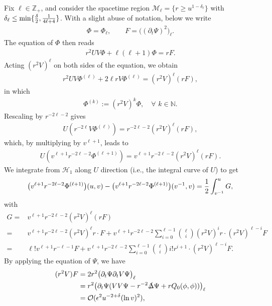 \documentclass[a4paper,reqno]{amsart}
\theoremstyle{definition}
\numberwithin{equation}{section}
\def\Deltas{\slashed{\Delta}}
\def\ep{\epsilon}
\begin{document}
Fix $\ell \in \mathbb{Z}_+$, and consider the spacetime region $\mathcal{M}_{\ell} =\{ r\geq u^{1-\delta_\ell} \}$ with $\delta_\ell \leq \min\{ {\delta\over 2},{1\over 4\ell + 4}\}$. 
With a slight abuse of notation, below we write
\begin{align*}
    \Phi = \Phi_{\ell}, \qquad F = \big((\partial_t \Psi)^2\big)_{\ell}.
\end{align*}
The equation of $\Phi$ then reads
\begin{align*}
    r^2 U V \Phi + \ell (\ell+1) \Phi = rF.
\end{align*}
Acting $(r^2 V)^\ell$ on both sides of the equation, we obtain
\begin{align*}
    r^2 U V \Phi^{(\ell)} + 2\ell r V\Phi^{(\ell)} = (r^2 V)^\ell (rF),
\end{align*}
in which
\begin{align*}
    \Phi^{(k)} := (r^2 V)^k \Phi, \quad \forall \,\, k\in\mathbb{N}.
\end{align*}
Rescaling by $r^{-2\ell -2}$ gives
\begin{align*}
    U(r^{-2\ell} V\Phi^{(\ell)})
    =
    r^{-2\ell-2} (r^2 V)^\ell (rF),
\end{align*}
which, by multiplying by $v^{\ell+1}$, leads to
\begin{align*}
    U(v^{\ell+1} r^{-2\ell-2} \Phi^{(\ell+1)})
    =
    v^{\ell+1}r^{-2\ell-2} (r^2 V)^\ell (rF).
\end{align*}
We integrate from $\mathcal{H}_1$ along $U$ direction (i.e., the integral curve of $U$) to get
\begin{align*}
    \big(v^{\ell+1} r^{-2\ell-2} \Phi^{(\ell+1)}\big)(u, v)
    -
    \big(v^{\ell+1} r^{-2\ell-2} \Phi^{(\ell+1)}\big)(v^{-1}, v)
    =
    {1\over 2}\int_{v^{-1}}^u G ,
\end{align*}
with
\begin{align*}
    G
    = {}&v^{\ell+1}r^{-2\ell-2} (r^2 V)^\ell (rF)
    \\
    = {}&v^{\ell+1} r^{-2\ell-2} (r^2 V)^{\ell}r \cdot F
    +
    v^{\ell+1} r^{-2\ell-2} \sum_{i=0}^{\ell-1} \binom{\ell}{i} (r^2 V)^{i} r \cdot (r^2 V)^{\ell-i}F
    \\
    ={}
    &\ell! v^{\ell+1} r^{-\ell-1} F
    +
     v^{\ell+1} r^{-2\ell-2} \sum_{i=0}^{\ell-1} 
\binom{\ell}{i} 
i! r^{i+1} \cdot (r^2 V)^{\ell-i}F.
\end{align*}
By applying the equation of $\Psi$, we have
\begin{align*}
    (r^2 V) F = {}&2r^2 \big(\partial_t \Psi \partial_t V \Psi\big)_{\ell}
    \\
    = {}&r^2 \big(\partial_t \Psi (VV\Psi -r^{-2} \Deltas\Psi + r Q_{0}(\phi, \phi))\big)_{\ell}
    \\
    ={}
    &\mathcal{O}(\ep^2 u^{-2+\delta} (\ln{v})^2),
\end{align*}
\end{document}
